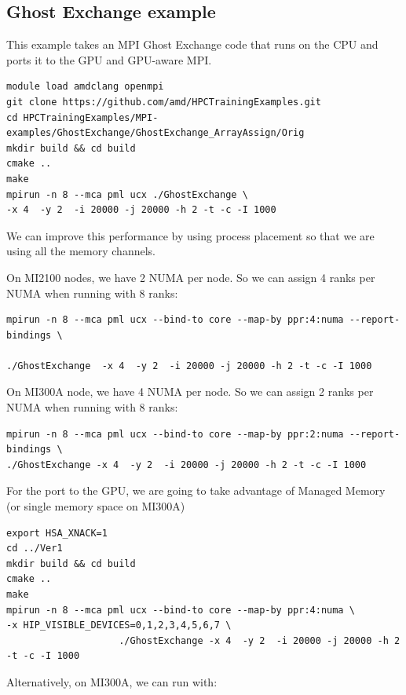 \documentclass[
]{article}
\begin{document}
\hypertarget{ghost-exchange-example}{%
\subsection{Ghost Exchange example}\label{ghost-exchange-example}}

This example takes an MPI Ghost Exchange code that runs on the CPU and
ports it to the GPU and GPU-aware MPI.

\begin{verbatim}
module load amdclang openmpi
git clone https://github.com/amd/HPCTrainingExamples.git
cd HPCTrainingExamples/MPI-examples/GhostExchange/GhostExchange_ArrayAssign/Orig
mkdir build && cd build
cmake ..
make
mpirun -n 8 --mca pml ucx ./GhostExchange \
-x 4  -y 2  -i 20000 -j 20000 -h 2 -t -c -I 1000
\end{verbatim}

We can improve this performance by using process placement so that we
are using all the memory channels.

On MI2100 nodes, we have 2 NUMA per node. So we can assign 4 ranks per
NUMA when running with 8 ranks:

\begin{verbatim}
mpirun -n 8 --mca pml ucx --bind-to core --map-by ppr:4:numa --report-bindings \

./GhostExchange  -x 4  -y 2  -i 20000 -j 20000 -h 2 -t -c -I 1000
\end{verbatim}

On MI300A node, we have 4 NUMA per node. So we can assign 2 ranks per
NUMA when running with 8 ranks:

\begin{verbatim}
mpirun -n 8 --mca pml ucx --bind-to core --map-by ppr:2:numa --report-bindings \
./GhostExchange -x 4  -y 2  -i 20000 -j 20000 -h 2 -t -c -I 1000
\end{verbatim}

For the port to the GPU, we are going to take advantage of Managed
Memory (or single memory space on MI300A)

\begin{verbatim}
export HSA_XNACK=1
cd ../Ver1
mkdir build && cd build
cmake ..
make
mpirun -n 8 --mca pml ucx --bind-to core --map-by ppr:4:numa \
-x HIP_VISIBLE_DEVICES=0,1,2,3,4,5,6,7 \ 
                    ./GhostExchange -x 4  -y 2  -i 20000 -j 20000 -h 2 -t -c -I 1000
\end{verbatim}

Alternatively, on MI300A, we can run with:
\end{document}

